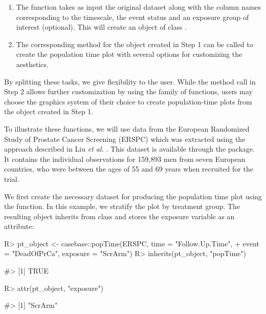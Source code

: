 \documentclass[
]{jss}
\providecommand{\tightlist}{%
  \setlength{\itemsep}{0pt}\setlength{\parskip}{0pt}}
\begin{document}
\begin{enumerate}
\def\labelenumi{\arabic{enumi}.}
\tightlist
\item
  The  function takes as input the original
  dataset along with the column names corresponding to the timescale,
  the event status and an exposure group of interest (optional). This
  will create an object of class .\\
\item
  The corresponding  method for the object created in Step 1
  can be called to create the population time plot with several options
  for customizing the aesthetics.
\end{enumerate}

By splitting these tasks, we give flexibility to the user. While the
method call in Step 2 allows further customization by using the
 \citep{ggplot2} family of functions, users may choose the
graphics system of their choice to create population-time plots from the
object created in Step 1.

To illustrate these functions, we will use data from the European
Randomized Study of Prostate Cancer Screening (ERSPC)
\citep{schroder2009screening} which was extracted using the approach
described in Liu \emph{et al.} \citeyearpar{liu2014recovering}. This
dataset is available through the  package. It contains the
individual observations for 159,893 men from seven European countries,
who were between the ages of 55 and 69 years when recruited for the
trial.

We first create the necessary dataset for producing the population time
plot using the  function. In this example, we stratify the
plot by treatment group. The resulting object inherits from class
 and stores the exposure variable as an attribute:

\begin{CodeChunk}

\begin{CodeInput}
R> pt_object <- casebase::popTime(ERSPC, time = "Follow.Up.Time",
+                                event = "DeadOfPrCa", exposure = "ScrArm")
R> inherits(pt_object, "popTime")
\end{CodeInput}

\begin{CodeOutput}
#> [1] TRUE
\end{CodeOutput}

\begin{CodeInput}
R> attr(pt_object, "exposure")
\end{CodeInput}

\begin{CodeOutput}
#> [1] "ScrArm"
\end{CodeOutput}
\end{CodeChunk}
\end{document}
